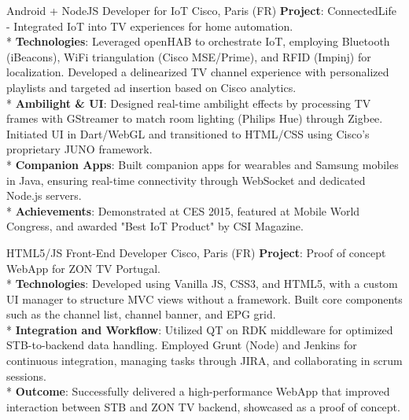 \documentclass[
  a4paper,
   maincolor=cvblue,
   sectioncolor=cvblue,
]{fortysecondscv}
\begin{document}
\begin{cvtable}
    {Android + NodeJS Developer for IoT}
    {Cisco, Paris (FR)}
    {
      \textbf{Project}: ConnectedLife - Integrated IoT into TV experiences for home automation.\\
      * \textbf{Technologies}: Leveraged openHAB to orchestrate IoT, employing Bluetooth (iBeacons), WiFi triangulation (Cisco MSE/Prime), and RFID (Impinj) for localization. Developed a delinearized TV channel experience with personalized playlists and targeted ad insertion based on Cisco analytics.\\
      * \textbf{Ambilight \& UI}: Designed real-time ambilight effects by processing TV frames with GStreamer to match room lighting (Philips Hue) through Zigbee. Initiated UI in Dart/WebGL and transitioned to HTML/CSS using Cisco’s proprietary JUNO framework.\\
      * \textbf{Companion Apps}: Built companion apps for wearables and Samsung mobiles in Java, ensuring real-time connectivity through WebSocket and dedicated Node.js servers.\\
      * \textbf{Achievements}: Demonstrated at CES 2015, featured at Mobile World Congress, and awarded "Best IoT Product" by CSI Magazine.\\
    }
\end{cvtable}




\begin{cvtable}
    {HTML5/JS Front-End Developer}
    {Cisco, Paris (FR)}
    {
      \textbf{Project}: Proof of concept WebApp for ZON TV Portugal.\\
      * \textbf{Technologies}: Developed using Vanilla JS, CSS3, and HTML5, with a custom UI manager to structure MVC views without a framework. Built core components such as the channel list, channel banner, and EPG grid.\\
      * \textbf{Integration and Workflow}: Utilized QT on RDK middleware for optimized STB-to-backend data handling. Employed Grunt (Node) and Jenkins for continuous integration, managing tasks through JIRA, and collaborating in scrum sessions.\\
      * \textbf{Outcome}: Successfully delivered a high-performance WebApp that improved interaction between STB and ZON TV backend, showcased as a proof of concept.
    }
\end{cvtable}
\end{document}
